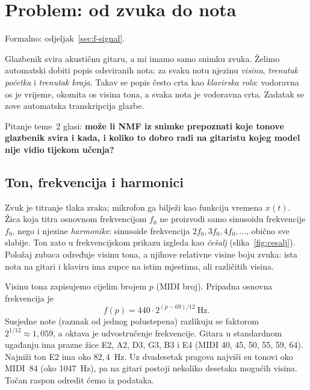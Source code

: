 \documentclass[11pt,a4paper]{article}
\theoremstyle{definition}
\theoremstyle{plain}
\theoremstyle{remark}
\newcommand{\formalno}[1]{{\small\color{muted}\sffamily Formalno: odjeljak~\ref{#1}.}\par}
\begin{document}
\section{Problem: od zvuka do nota}\label{sec:i-problem}
\formalno{sec:f-signal}

Glazbenik svira akustičnu gitaru, a mi imamo samo snimku zvuka. Želimo automatski dobiti popis
odsviranih nota: za svaku notu njezinu \emph{visinu}, \emph{trenutak početka} i \emph{trenutak
kraja}. Takav se popis često crta kao \emph{klavirska rola}: vodoravna os je vrijeme, okomita os
visina tona, a svaka nota je vodoravna crta. Zadatak se zove automatska transkripcija glazbe.

Pitanje teme~2 glasi: \textbf{može li NMF iz snimke prepoznati koje tonove glazbenik svira i kada,
i koliko to dobro radi na gitaristu kojeg model nije vidio tijekom učenja?}

\subsection{Ton, frekvencija i harmonici}

Zvuk je titranje tlaka zraka; mikrofon ga bilježi kao funkciju vremena $x(t)$. Žica koja titra
osnovnom frekvencijom $f_0$ ne proizvodi samo sinusoidu frekvencije $f_0$, nego i njezine
\emph{harmonike}: sinusoide frekvencija $2f_0, 3f_0, 4f_0,\dots$, obično sve slabije. Ton zato u
frekvencijskom prikazu izgleda kao \emph{češalj} (slika~\ref{fig:cesalj}). Položaj zubaca određuje
visinu tona, a njihove relativne visine boju zvuka: ista nota na gitari i klaviru ima zupce na
istim mjestima, ali različitih visina.

Visinu tona zapisujemo cijelim brojem $p$ (MIDI broj). Pripadna osnovna frekvencija je
\[
  f(p) = 440 \cdot 2^{(p-69)/12}\ \text{Hz}.
\]
Susjedne note (razmak od jednog polustepena) razlikuju se faktorom $2^{1/12}\approx 1{,}059$, a
oktava je udvostručenje frekvencije. Gitara u standardnom ugađanju ima prazne žice E2, A2, D3, G3,
B3 i E4 (MIDI 40, 45, 50, 55, 59, 64). Najniži ton E2 ima oko $82{,}4$~Hz. Uz dvadesetak pragova
najviši su tonovi oko MIDI~84 (oko 1047~Hz), pa na gitari postoji nekoliko desetaka mogućih
visina. Točan raspon odredit ćemo iz podataka.
\end{document}
